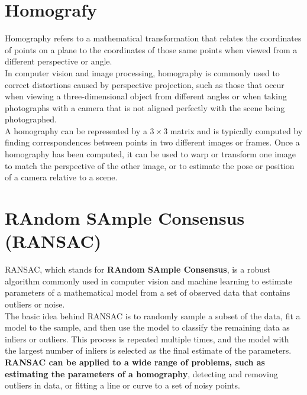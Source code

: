 \documentclass{article}
\begin{document}
\section*{Homografy}

Homography refers to a mathematical transformation that relates the coordinates of points on a plane to the coordinates of those same points when viewed from a different perspective or angle. \\

In computer vision and image processing, homography is commonly used to correct distortions caused by perspective projection, such as those that occur when viewing a three-dimensional object from different angles or when taking photographs with a camera that is not aligned perfectly with the scene being photographed. \\

A homography can be represented by a $3\times3$ matrix and is typically computed by finding correspondences between points in two different images or frames. Once a homography has been computed, it can be used to warp or transform one image to match the perspective of the other image, or to estimate the pose or position of a camera relative to a scene.

\newpage

\section*{RAndom SAmple Consensus (RANSAC)}

RANSAC, which stands for \textbf{RAndom SAmple Consensus}, is a robust algorithm commonly used in computer vision and machine learning to estimate parameters of a mathematical model from a set of observed data that contains outliers or noise. \\

The basic idea behind RANSAC is to randomly sample a subset of the data, fit a model to the sample, and then use the model to classify the remaining data as inliers or outliers. This process is repeated multiple times, and the model with the largest number of inliers is selected as the final estimate of the parameters. \\

\textbf{RANSAC can be applied to a wide range of problems, such as estimating the parameters of a homography}, detecting and removing outliers in data, or fitting a line or curve to a set of noisy points. \\
\end{document}
